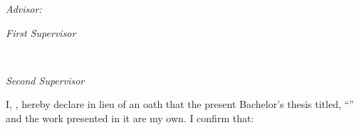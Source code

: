 \begin{titlepage}
\vfill\vfill\vfill
{ \large \center 
\textit{Advisor:}\\
\Advisor
}
\vfill
    \begin{minipage}{0.48\textwidth}
\begin{flushleft}
\large
\textit{First Supervisor}\\
\FirstSupervisor
\end{flushleft}
\end{minipage}
~
\begin{minipage}{0.48\textwidth}
\begin{flushright}
\large
\textit{Second Supervisor}\\
\SecondSupervisor
\end{flushright}
\end{minipage}

 
\vfill %
\end{titlepage}



\vfill
\noindent I, \AuthorofThesis, hereby declare in lieu of an oath that the present Bachelor's thesis titled, \enquote{\TitleofThesis{}} and the work presented in it are my own. I confirm that:

